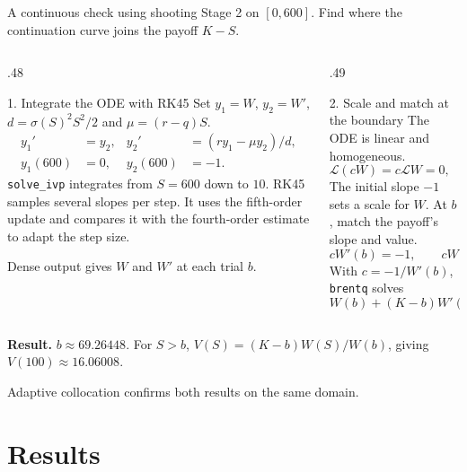 \documentclass[aspectratio=169,11pt]{beamer}
\newcommand{\Lop}{\mathcal{L}}
\begin{document}
\begin{frame}[t]{A continuous check using shooting}
\small
Stage 2 on $[0,600]$. Find where the continuation curve joins the payoff $K-S$.

\begin{columns}[T,onlytextwidth]
\begin{column}{.48\textwidth}
\begin{block}{1. Integrate the ODE with RK45}
\footnotesize
Set $y_1=W$, $y_2=W'$, $d=\sigma(S)^2S^2/2$ and $\mu=(r-q)S$.
\setlength{\abovedisplayskip}{4pt}
\setlength{\belowdisplayskip}{4pt}
\setlength{\abovedisplayshortskip}{3pt}
\setlength{\belowdisplayshortskip}{3pt}
\[
 \begin{aligned}
 y_1'&=y_2, & y_2'&=(r y_1-\mu y_2)/d,\\
 y_1(600)&=0, & y_2(600)&=-1.
 \end{aligned}
\]
\texttt{solve\_ivp} integrates from $S=600$ down to $10$.
RK45 samples several slopes per step. It uses the fifth-order update and compares it with the fourth-order estimate to adapt the step size.
\par
Dense output gives $W$ and $W'$ at each trial $b$.
\end{block}
\end{column}
\begin{column}{.49\textwidth}
\begin{block}{2. Scale and match at the boundary}
\footnotesize
The ODE is linear and homogeneous.
\setlength{\abovedisplayskip}{4pt}
\setlength{\belowdisplayskip}{4pt}
\setlength{\abovedisplayshortskip}{3pt}
\setlength{\belowdisplayshortskip}{3pt}
\[
 \Lop(cW)=c\Lop W=0,\qquad cW(600)=0.
\]
The initial slope $-1$ sets a scale for $W$.
At $b$, match the payoff's slope and value.
\[
 cW'(b)=-1,\qquad cW(b)=K-b.
\]
With $c=-1/W'(b)$, \texttt{brentq} solves
\[
 W(b)+(K-b)W'(b)=0\quad (30<b<99).
\]
\end{block}
\end{column}
\end{columns}

\smallskip
\textbf{Result.} $b\approx69.26448$. For $S>b$, $V(S)=(K-b)W(S)/W(b)$, giving $V(100)\approx16.06008$.
\par
Adaptive collocation confirms both results on the same domain.
\end{frame}
\section{Results}
\end{document}
